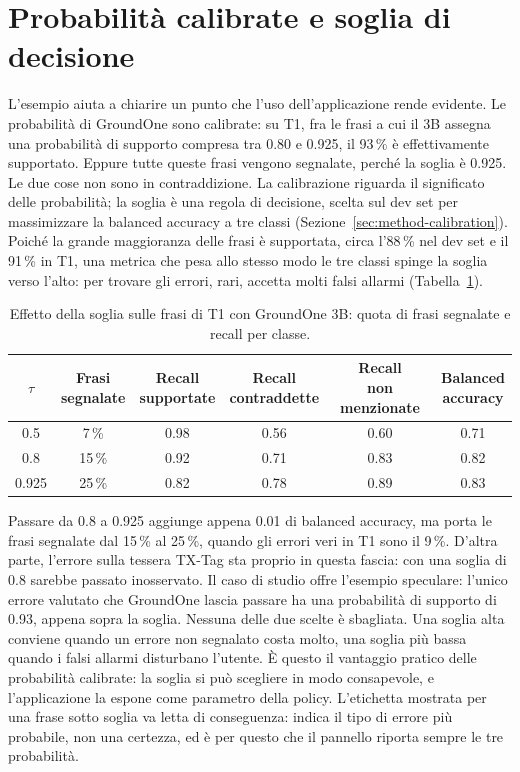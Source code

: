 \section{Probabilità calibrate e soglia di decisione}
\label{sec:studio-threshold}

L'esempio aiuta a chiarire un punto che l'uso dell'applicazione rende evidente. Le probabilità di GroundOne sono
calibrate: su T1, fra le frasi a cui il 3B assegna una probabilità di supporto compresa tra 0.80 e 0.925, il 93\,\% è
effettivamente supportato. Eppure tutte queste frasi vengono segnalate, perché la soglia è 0.925. Le due cose non sono in
contraddizione. La calibrazione riguarda il significato delle probabilità; la soglia è una regola di decisione, scelta sul
dev set per massimizzare la balanced accuracy a tre classi (Sezione~\ref{sec:method-calibration}). Poiché la grande
maggioranza delle frasi è supportata, circa l'88\,\% nel dev set e il 91\,\% in T1, una metrica che pesa allo stesso modo
le tre classi spinge la soglia verso l'alto: per trovare gli errori, rari, accetta molti falsi allarmi
(Tabella~\ref{tab:studio-threshold}).

\begin{table}[htbp]
\centering
\caption{Effetto della soglia sulle frasi di T1 con GroundOne 3B: quota di frasi segnalate e recall per classe.}
\label{tab:studio-threshold}
\small
\begin{tabular}{cccccc}
\toprule
$\tau$ & \makecell{Frasi\\segnalate} & \makecell{Recall\\supportate} & \makecell{Recall\\contraddette} & \makecell{Recall\\non menzionate} & \makecell{Balanced\\accuracy} \\
\midrule
0.5 & 7\,\% & 0.98 & 0.56 & 0.60 & 0.71 \\
0.8 & 15\,\% & 0.92 & 0.71 & 0.83 & 0.82 \\
0.925 & 25\,\% & 0.82 & 0.78 & 0.89 & 0.83 \\
\bottomrule
\end{tabular}
\end{table}

Passare da 0.8 a 0.925 aggiunge appena 0.01 di balanced accuracy, ma porta le frasi segnalate dal 15\,\% al 25\,\%, quando
gli errori veri in T1 sono il 9\,\%. D'altra parte, l'errore sulla tessera TX-Tag sta proprio in questa fascia: con una
soglia di 0.8 sarebbe passato inosservato. Il caso di studio offre l'esempio speculare: l'unico errore valutato che GroundOne lascia passare ha una probabilità di supporto di 0.93, appena sopra la soglia. Nessuna delle due scelte è sbagliata. Una soglia
alta conviene quando un errore non segnalato costa molto, una soglia più bassa quando i falsi allarmi disturbano l'utente.
È questo il vantaggio pratico delle probabilità calibrate: la soglia si può scegliere in modo consapevole, e l'applicazione
la espone come parametro della policy. L'etichetta mostrata per una frase sotto soglia va letta di conseguenza: indica il
tipo di errore più probabile, non una certezza, ed è per questo che il pannello riporta sempre le tre probabilità.

